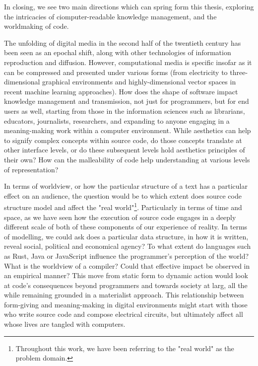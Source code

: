 \spacer

In closing, we see two main directions which can spring form this thesis, exploring the intricacies of ciomputer-readable knowledge management, and the worldmaking of code.

The unfolding of digital media in the second half of the twentieth century has been seen as an epochal shift, along with other technologies of information reproduction and diffusion. However, computational media is specific insofar as it can be compressed and presented under various forms (from electricity to three-dimensional graphical environments and highly-dimensional vector spaces in recent machine learning approaches). How does the shape of software impact knowledge management and transmission, not just for programmers, but for end users as well, starting from those in the information sciences such as librarians, educators, journalists, researchers, and expanding to anyone engaging in a meaning-making work within a computer environment. While aesthetics can help to signify complex concepts within source code, do those concepts translate at other interface levels, or do these subsequent levels hold aesthetics principles of their own? How can the malleability of code help understanding at various levels of representation?

In terms of worldview, or how the particular structure of a text has a particular effect on an audience, the question would be to which extent does source code structure model and affect the "real world"\footnote{Throughout this work, we have been referring to the "real world" as the problem domain.}. Particularly in terms of  time and space, as we have seen how the execution of source code engages in a deeply different scale of both of these components of our experience of reality. In terms of modelling, we could ask does a particular data structure, in how it is written, reveal social, political and economical agency? To what extent do languages such as Rust, Java or JavaScript influence the programmer's perception of the world? What is the worldview of a compiler? Could that effective impact be observed in an empirical manner? This move from static form to dynamic action would look at code's consequences beyond programmers and towards society at larg, all the while remaining grounded in a materialist approach. This relationship between form-giving and meaning-making in digital environments might start with those who write source code and compose electrical circuits, but ultimately affect all whose lives are tangled with computers.